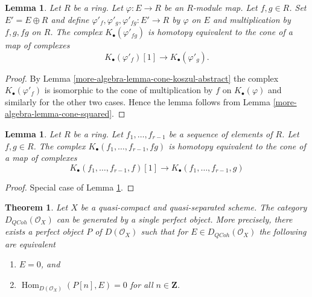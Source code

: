 \documentclass{amsart}
\theoremstyle{plain}
\newtheorem{theorem}[subsection]{Theorem}
\newtheorem{lemma}[subsection]{Lemma}
\theoremstyle{definition}
\theoremstyle{remark}
\numberwithin{equation}{subsection}
\def\Hom{\mathop{\mathrm{Hom}}\nolimits}
\def\QCoh{\mathit{QCoh}}
\begin{document}
\begin{lemma}
\label{more-algebra-lemma-koszul-mult-abstract}
Let $R$ be a ring. Let $\varphi : E \to R$ be an $R$-module map.
Let $f, g \in R$. Set $E' = E \oplus R$ and define
$\varphi'_f, \varphi'_g, \varphi'_{fg} : E' \to R$
by $\varphi$ on $E$ and multiplication by $f, g, fg$ on $R$.
The complex $K_\bullet(\varphi'_{fg})$ is homotopy equivalent to the
cone of a map of complexes
$$
K_\bullet(\varphi'_f)[1]
\longrightarrow
K_\bullet(\varphi'_g).
$$
\end{lemma}

\begin{proof}
By
Lemma \ref{more-algebra-lemma-cone-koszul-abstract}
the complex $K_\bullet(\varphi'_f)$ is isomorphic to the cone of
multiplication by $f$ on $K_\bullet(\varphi)$ and similarly
for the other two cases. Hence the lemma follows from
Lemma \ref{more-algebra-lemma-cone-squared}.
\end{proof}

\begin{lemma}
\label{more-algebra-lemma-koszul-mult}
Let $R$ be a ring. Let $f_1, \ldots, f_{r - 1}$ be a sequence of elements
of $R$. Let $f, g \in R$. The complex
$K_\bullet(f_1, \ldots, f_{r - 1}, fg)$
is homotopy equivalent to the cone of a map of complexes
$$
K_\bullet(f_1, \ldots, f_{r - 1}, f)[1]
\longrightarrow
K_\bullet(f_1, \ldots, f_{r - 1}, g)
$$
\end{lemma}

\begin{proof}
Special case of
Lemma \ref{more-algebra-lemma-koszul-mult-abstract}.
\end{proof}


\begin{theorem}
\label{theorem-bondal-van-den-Bergh}
Let $X$ be a quasi-compact and quasi-separated scheme. The category
$D_\QCoh(\mathcal{O}_X)$ can be generated by a single
perfect object. More precisely, there exists a perfect object
$P$ of $D(\mathcal{O}_X)$ such that for 
$E \in D_\QCoh(\mathcal{O}_X)$ the following are equivalent
\begin{enumerate}
\item $E = 0$, and
\item $\Hom_{D(\mathcal{O}_X)}(P[n], E) = 0$ for all $n \in \mathbf{Z}$.
\end{enumerate}
\end{theorem}
\end{document}
